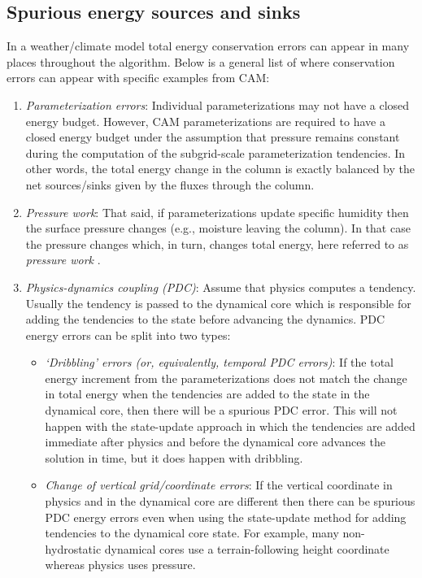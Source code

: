 \documentclass{agujournal}
\begin{document}
\subsection{Spurious energy sources and sinks}\label{subsec:spuriousE}
In a weather/climate model total energy conservation errors can appear in many places throughout the algorithm. Below is a general list of where conservation errors can appear with specific examples from CAM:
\begin{enumerate}
\item {\em{Parameterization errors}}: Individual parameterizations may not have a closed energy budget. However, CAM parameterizations are required to have a closed energy budget under the assumption that pressure remains constant during the computation of the subgrid-scale parameterization tendencies. In other words, the total energy change in the column is exactly balanced by the net sources/sinks given by the fluxes through the column. 
\item {\em{Pressure work}}: That said, if parameterizations update specific humidity then the surface pressure changes (e.g., moisture leaving the column). In that case the pressure changes which, in turn, changes total energy, here referred to as {\em{pressure work}} \citep[section 3.1.8 in ][]{CAM5}.
\item {\em{Physics-dynamics coupling (PDC)}}: Assume that physics computes a tendency. Usually the tendency is passed to the dynamical core which is responsible for adding the tendencies to the state before advancing the dynamics. PDC energy errors can be split into two types:
\begin{itemize}
\item {\em{`Dribbling' errors (or, equivalently, temporal PDC errors)}}: If the total energy increment from the parameterizations does not match the change in total energy when the tendencies are added to the state in the dynamical core, then there will be a spurious PDC error. This will not happen with the state-update approach in which the tendencies are added immediate after physics and before the dynamical core advances the solution in time, but it does happen with dribbling. 
\item {\em{Change of vertical grid/coordinate errors}}: If the vertical coordinate in physics and in the dynamical core are different then there can be spurious PDC energy errors even when using the state-update method for adding tendencies to the dynamical core state. For example, many non-hydrostatic dynamical cores \citep[e.g. MPAS, ]{MPASatm} use a terrain-following height coordinate whereas physics uses pressure.

\end{itemize}
\end{enumerate}
\end{document}
